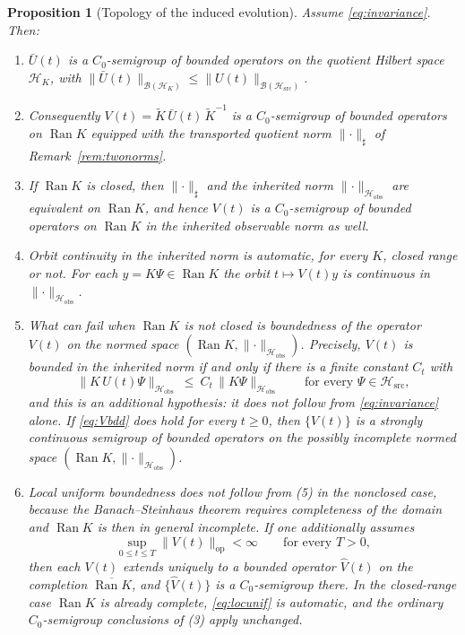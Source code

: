 \documentclass[11pt,reqno]{amsart}
\numberwithin{equation}{section}
\theoremstyle{plain}
\newtheorem{proposition}[theorem]{Proposition}
\theoremstyle{definition}
\theoremstyle{remark}
\newcommand{\Hsrc}{\mathcal{H}_{\mathrm{src}}}
\newcommand{\Hobs}{\mathcal{H}_{\mathrm{obs}}}
\newcommand{\HK}{\mathcal{H}_{K}}
\newcommand{\Ran}{\operatorname{Ran}}
\newcommand{\Kt}{\widetilde{K}}
\begin{document}
\begin{proposition}[Topology of the induced evolution]
\label{prop:topology}
Assume \eqref{eq:invariance}. Then:
\begin{enumerate}
\item $\bar U(t)$ is a $C_{0}$-semigroup of bounded operators on the quotient Hilbert space
$\HK$, with $\lVert\bar U(t)\rVert_{\mathcal{B}(\HK)}\le\lVert U(t)\rVert_{\mathcal{B}(\Hsrc)}$.
\item Consequently $V(t)=\Kt\,\bar U(t)\,\Kt^{-1}$ is a $C_{0}$-semigroup of bounded
operators on $\Ran K$ \emph{equipped with the transported quotient norm}
$\lVert\cdot\rVert_{\sharp}$ of Remark~\ref{rem:twonorms}.
\item If $\Ran K$ is closed, then $\lVert\cdot\rVert_{\sharp}$ and the inherited norm
$\lVert\cdot\rVert_{\Hobs}$ are equivalent on $\Ran K$, and hence $V(t)$ is a
$C_{0}$-semigroup of bounded operators on $\Ran K$ in the inherited observable norm as well.
\item \emph{Orbit continuity in the inherited norm is automatic, for every $K$, closed range
or not.} For each $y=K\Psi\in\Ran K$ the orbit $t\mapsto V(t)y$ is continuous in
$\lVert\cdot\rVert_{\Hobs}$.
\item What can fail when $\Ran K$ is not closed is \emph{boundedness of the operator $V(t)$}
on the normed space $(\Ran K,\lVert\cdot\rVert_{\Hobs})$. Precisely, $V(t)$ is bounded in the
inherited norm if and only if there is a finite constant $C_{t}$ with
\begin{equation}
\label{eq:Vbdd}
\lVert K\,U(t)\Psi\rVert_{\Hobs}\ \le\ C_{t}\,\lVert K\Psi\rVert_{\Hobs}
\qquad\text{for every }\Psi\in\Hsrc ,
\end{equation}
and this is an \emph{additional} hypothesis: it does not follow from \eqref{eq:invariance}
alone. If \eqref{eq:Vbdd} does hold for every $t\ge0$, then $\{V(t)\}$ is a strongly continuous
semigroup of bounded operators on the \emph{possibly incomplete} normed space
$(\Ran K,\lVert\cdot\rVert_{\Hobs})$.
\item Local uniform boundedness does \emph{not} follow from (5) in the nonclosed case, because
the Banach--Steinhaus theorem requires completeness of the domain and $\Ran K$ is then in
general incomplete. If one \emph{additionally} assumes
\begin{equation}
\label{eq:locunif}
\sup_{0\le t\le T}\lVert V(t)\rVert_{\mathrm{op}}<\infty
\qquad\text{for every }T>0,
\end{equation}
then each $V(t)$ extends uniquely to a bounded operator $\widehat V(t)$ on the completion
$\overline{\Ran K}$, and $\{\widehat V(t)\}$ is a $C_{0}$-semigroup there. In the closed-range
case $\Ran K$ is already complete, \eqref{eq:locunif} is automatic, and the ordinary
$C_{0}$-semigroup conclusions of (3) apply unchanged.
\end{enumerate}
\end{proposition}
\end{document}
